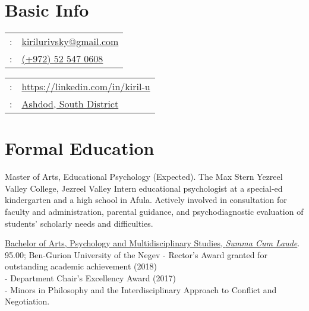 \setLTR
\maketitle
\section{Basic Info}
\begin{minipage}[t]{.5\linewidth}
\begin{tabular}{rp{.75\linewidth}}
\baselineskip=20pt
\email{} :   & \href{mailto:kirilurivsky@gmail.com}{kirilurivsky@gmail.com}\\
\phone{} : &\href{tel:972525470608}{(+972) 52 547 0608} \\
\end{tabular}
\end{minipage}
\begin{minipage}[t]{.5\linewidth}
\begin{tabular}{rl}
\linkedin{} : &\href{https://www.linkedin.com/in/kiril-u}{https://linkedin.com/in/kiril-u}\\
\location{} : &\href{https://goo.gl/maps/MSacjpSy7vZSKykP7}{Ashdod, South District}                                                                          
\end{tabular}
\end{minipage}



% 

\section{Formal Education}

{Master of Arts, Educational Psychology (Expected). The Max Stern Yezreel Valley College, Jezreel Valley}
{Intern educational psychologist at a special-ed kindergarten and a high school in Afula. Actively involved in consultation for faculty and administration, parental guidance, and psychodiagnostic evaluation of students' scholarly needs and difficulties.}
{}

{\href{https://www.dropbox.com/s/pcm0mybvgi85ma0/BA-Psych.pdf?dl=0}{Bachelor of Arts, Psychology and Multidisciplinary Studies, \textit{Summa Cum Laude}}. 95.00; Ben-Gurion University of the Negev}
{- Rector's Award granted for outstanding academic achievement (2018) \\
- Department Chair’s Excellency Award (2017) \\
- Minors in Philosophy and the Interdisciplinary Approach to Conflict and Negotiation.}
{}
\par{\par}

